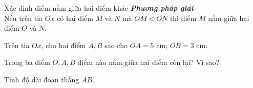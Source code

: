 \begin{dang}{Xác định điểm nằm giữa hai điểm khác}
	\textbf{\textit{Phương pháp giải}}\\
	Nếu trên tia $Ox$ có hai điểm $M$ và $N$ mà $OM<ON$ thì điểm $M$ nằm giữa hai điểm $O$ và $N$.
\end{dang}
\begin{vd}%
	Trên tia $Ox$, cho hai điểm $A,B$ sao cho $OA=5$ cm, $OB=3$ cm.
	\begin{enumEX}{1}
		\item Trong ba điểm $O,A,B$ điểm nào nằm giữa hai điểm còn lại? Vì sao?
		\item Tính độ dài đoạn thẳng $AB$.
	\end{enumEX}
\end{vd}

